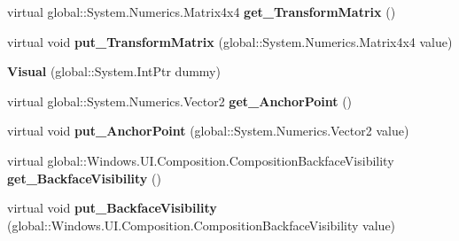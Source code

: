 \begin{DoxyCompactItemize}
\item 
\mbox{\label{class_windows_1_1_u_i_1_1_composition_1_1_visual_a8c23adab99bc95b5ccbf93a75ed76265}} 
virtual global\+::\+System.\+Numerics.\+Matrix4x4 {\bfseries get\+\_\+\+Transform\+Matrix} ()
\item 
\mbox{\label{class_windows_1_1_u_i_1_1_composition_1_1_visual_a2689ab7c32a3c7a5d1978aa89a514762}} 
virtual void {\bfseries put\+\_\+\+Transform\+Matrix} (global\+::\+System.\+Numerics.\+Matrix4x4 value)
\item 
\mbox{\label{class_windows_1_1_u_i_1_1_composition_1_1_visual_ae752ab49085c6766890dc632d053d6e8}} 
{\bfseries Visual} (global\+::\+System.\+Int\+Ptr dummy)
\item 
\mbox{\label{class_windows_1_1_u_i_1_1_composition_1_1_visual_a5c51998e94ec1776d9b212fef7f643c6}} 
virtual global\+::\+System.\+Numerics.\+Vector2 {\bfseries get\+\_\+\+Anchor\+Point} ()
\item 
\mbox{\label{class_windows_1_1_u_i_1_1_composition_1_1_visual_aa1b0464e36040159979a9f686b078861}} 
virtual void {\bfseries put\+\_\+\+Anchor\+Point} (global\+::\+System.\+Numerics.\+Vector2 value)
\item 
\mbox{\label{class_windows_1_1_u_i_1_1_composition_1_1_visual_ab37e8a416eb15adcf52595af082a3080}} 
virtual global\+::\+Windows.\+U\+I.\+Composition.\+Composition\+Backface\+Visibility {\bfseries get\+\_\+\+Backface\+Visibility} ()
\item 
\mbox{\label{class_windows_1_1_u_i_1_1_composition_1_1_visual_a3b737ed77f1a9773db7d7bba9085d735}} 
virtual void {\bfseries put\+\_\+\+Backface\+Visibility} (global\+::\+Windows.\+U\+I.\+Composition.\+Composition\+Backface\+Visibility value)
\item 
\mbox{\label{class_windows_1_1_u_i_1_1_composition_1_1_visual_aadde0309db11b0ab71defebf5ac36226}} 

\end{DoxyCompactItemize}
